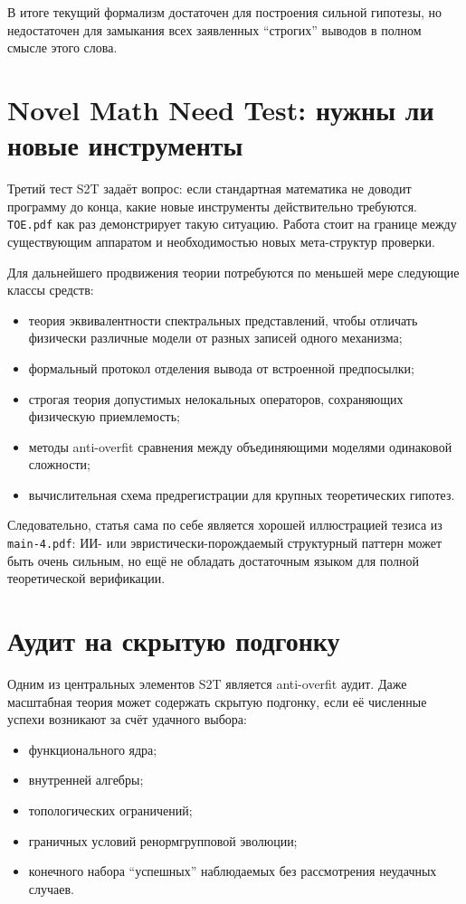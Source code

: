 \documentclass[12pt,a4paper]{article}
\begin{document}
В итоге текущий формализм достаточен для построения сильной гипотезы, но недостаточен для замыкания всех заявленных ``строгих'' выводов в полном смысле этого слова.

\section{Novel Math Need Test: нужны ли новые инструменты}

Третий тест S2T задаёт вопрос: если стандартная математика не доводит программу до конца, какие новые инструменты действительно требуются. \texttt{TOE.pdf} как раз демонстрирует такую ситуацию. Работа стоит на границе между существующим аппаратом и необходимостью новых мета-структур проверки.

Для дальнейшего продвижения теории потребуются по меньшей мере следующие классы средств:
\begin{itemize}
    \item теория эквивалентности спектральных представлений, чтобы отличать физически различные модели от разных записей одного механизма;
    \item формальный протокол отделения вывода от встроенной предпосылки;
    \item строгая теория допустимых нелокальных операторов, сохраняющих физическую приемлемость;
    \item методы anti-overfit сравнения между объединяющими моделями одинаковой сложности;
    \item вычислительная схема предрегистрации для крупных теоретических гипотез.
\end{itemize}

Следовательно, статья сама по себе является хорошей иллюстрацией тезиса из \texttt{main-4.pdf}: ИИ- или эвристически-порождаемый структурный паттерн может быть очень сильным, но ещё не обладать достаточным языком для полной теоретической верификации.

\section{Аудит на скрытую подгонку}

Одним из центральных элементов S2T является anti-overfit аудит. Даже масштабная теория может содержать скрытую подгонку, если её численные успехи возникают за счёт удачного выбора:
\begin{itemize}
    \item функционального ядра;
    \item внутренней алгебры;
    \item топологических ограничений;
    \item граничных условий ренормгрупповой эволюции;
    \item конечного набора ``успешных'' наблюдаемых без рассмотрения неудачных случаев.
\end{itemize}
\end{document}
